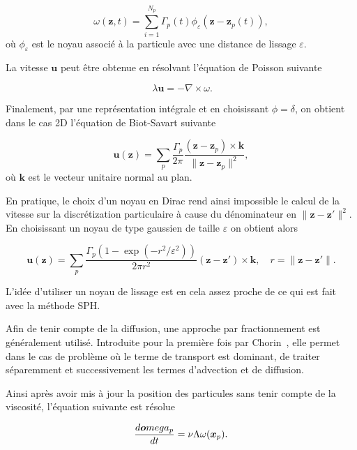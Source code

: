 \begin{equation*}
    \omega(\bm z, t) = \sum_{i=1}^{N_p} \Gamma_p(t) \phi_\varepsilon(\bm z - \bm z_p(t)),
\end{equation*}où $\phi_\varepsilon$ est le noyau associé à la particule avec une distance de lissage $\varepsilon$.

La vitesse $\bm u$ peut être obtenue en résolvant l'équation de Poisson suivante

\begin{equation*}~\label{eq:poisson}
    \lambda \bm u = - \nabla \times \omega.
\end{equation*}

Finalement, par une représentation intégrale et en choisissant $\phi= \delta$, on obtient dans le cas 2D l'équation de Biot-Savart suivante

\begin{equation*}
    \bm u(\bm z) = \sum_p \frac{\Gamma_p}{2\pi} \frac{(\bm z - \bm z_p)\times \bm k}{\|\bm z - \bm z_p\|^2},
\end{equation*}où $\bm k$ est le vecteur unitaire normal au plan.

En pratique, le choix d'un noyau en Dirac rend ainsi impossible le calcul de la vitesse sur la discrétization particulaire à cause du dénominateur en ${\|\bm z - \bm z'\|^2}$. En choisissant un noyau de type gaussien de taille $\varepsilon$ on obtient alors

\begin{equation*}
    \bm u(\bm z) = \sum_p \frac{\Gamma_p(1 - \exp(-r^2 / \varepsilon^2)) }{2\pi r^2} (\bm z - \bm z')\times \bm k, \quad r = \|\bm z - \bm z'\|.
\end{equation*}

L'idée d'utiliser un noyau de lissage est en cela assez proche de ce qui est fait avec la méthode SPH.

Afin de tenir compte de la diffusion, une approche par fractionnement est généralement utilisé. Introduite pour la première fois par Chorin~\cite{chorin_discretization_1973}, elle permet dans le cas de problème où le terme de transport est dominant, de traiter séparemment et successivement les termes d'advection et de diffusion.

Ainsi après avoir mis à jour la position des particules sans tenir compte de la viscosité, l'équation suivante est résolue

\begin{equation*}
    \frac{d\bm omega_p}{dt} = \nu \Lambda \omega(\bm{x}_p).
\end{equation*}

